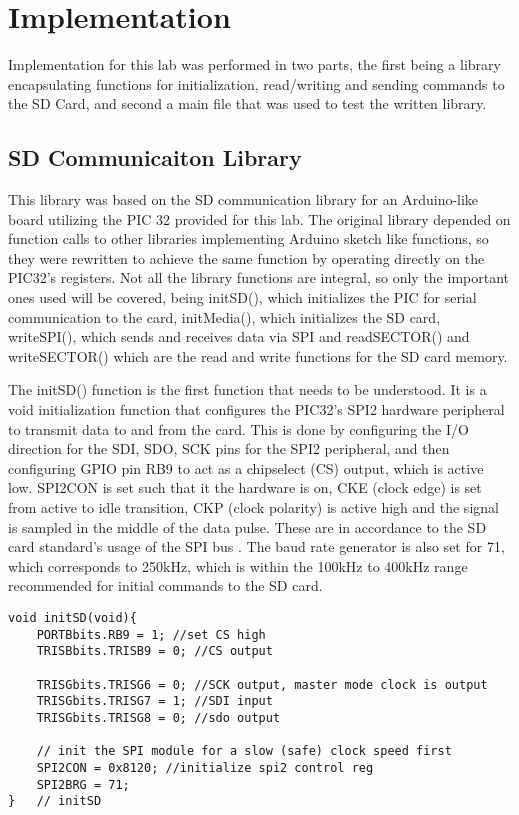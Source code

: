 \documentclass[12pt]{article}
\begin{document}
\section{Implementation}
Implementation for this lab was performed in two parts, the first being a library encapsulating functions for initialization, read/writing and sending commands to the SD Card, and second a main file that was used to test the written library.
\subsection*{\normalsize SD Communicaiton Library}
This library was based on the SD communication library for an Arduino-like board utilizing the PIC 32 provided for this lab. The original library depended on function calls to other libraries implementing Arduino sketch like functions, so they were rewritten to achieve the same function by operating directly on the PIC32's registers. Not all the library functions are integral, so only the important ones used will be covered, being initSD(), which initializes the PIC for serial communication to the card, initMedia(), which initializes the SD card, writeSPI(), which sends and receives data via SPI and readSECTOR() and writeSECTOR() which are the read and write functions for the SD card memory.\\\par 
The initSD() function is the first function that needs to be understood. It is a void initialization function that configures the PIC32's SPI2 hardware peripheral to transmit data to and from the card. This is done by configuring the I/O direction for the SDI, SDO, SCK pins for the SPI2 peripheral, and then configuring GPIO pin RB9 to act as a chipselect (CS) output, which is active low. SPI2CON is set such that it the hardware is on, CKE (clock edge) is set from active to idle transition, CKP (clock polarity) is active high and the signal is sampled in the middle of the data pulse. These are in accordance to the SD card standard's usage of the SPI bus . The baud rate generator is also set for 71, which corresponds to 250kHz, which is within the 100kHz to 400kHz range recommended for initial commands to the SD card.
\begin{lstlisting}
void initSD(void){
    PORTBbits.RB9 = 1; //set CS high
    TRISBbits.TRISB9 = 0; //CS output
   
    TRISGbits.TRISG6 = 0; //SCK output, master mode clock is output
    TRISGbits.TRISG7 = 1; //SDI input
    TRISGbits.TRISG8 = 0; //sdo output

	// init the SPI module for a slow (safe) clock speed first
    SPI2CON = 0x8120; //initialize spi2 control reg
    SPI2BRG = 71;
}   // initSD
\end{lstlisting}
\end{document}
